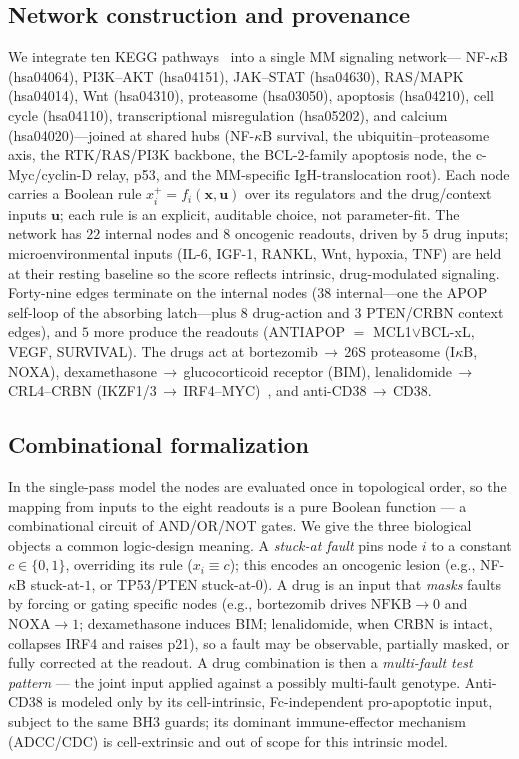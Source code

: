 \documentclass[conference,letterpaper]{IEEEtran}
\begin{document}
\subsection{Network construction and provenance}\label{sec:net}
We integrate ten KEGG pathways~\cite{kegg} into a single MM signaling network---%
NF-$\kappa$B (hsa04064), PI3K--AKT (hsa04151), JAK--STAT (hsa04630), RAS/MAPK
(hsa04014), Wnt (hsa04310), proteasome (hsa03050), apoptosis (hsa04210), cell
cycle (hsa04110), transcriptional misregulation (hsa05202), and calcium
(hsa04020)---joined at shared hubs (NF-$\kappa$B survival, the
ubiquitin--proteasome axis, the RTK/RAS/PI3K backbone, the BCL-2-family apoptosis
node, the c-Myc/cyclin-D relay, p53, and the MM-specific IgH-translocation root).
Each node carries a Boolean rule $x_i^{+}=f_i(\mathbf{x},\mathbf{u})$ over its
regulators and the drug/context inputs $\mathbf{u}$; each rule is an explicit,
auditable choice, not parameter-fit. The network has $22$ internal nodes and $8$
oncogenic readouts, driven by $5$ drug inputs; microenvironmental inputs (IL-6,
IGF-1, RANKL, Wnt, hypoxia, TNF) are held at their resting baseline so the score
reflects intrinsic, drug-modulated signaling. Forty-nine edges terminate on the
internal nodes ($38$ internal---one the APOP self-loop of the absorbing
latch---plus $8$ drug-action and $3$ PTEN/CRBN context edges), and $5$ more
produce the readouts (ANTIAPOP $=$ MCL1$\vee$BCL-xL, VEGF, SURVIVAL). The drugs
act at bortezomib\,$\to$\,26S proteasome (I$\kappa$B, NOXA),
dexamethasone\,$\to$\,glucocorticoid receptor (BIM),
lenalidomide\,$\to$\,CRL4--CRBN (IKZF1/3\,$\to$\,IRF4--MYC)~\cite{kronke}, and
anti-CD38\,$\to$\,CD38.


\subsection{Combinational formalization}\label{sec:comb}
In the single-pass model the nodes are evaluated once in topological order, so
the mapping from inputs to the eight readouts is a pure Boolean function --- a
combinational circuit of AND/OR/NOT gates. We give the three biological objects a
common logic-design meaning. A \emph{stuck-at fault} pins node $i$ to a constant
$c\in\{0,1\}$, overriding its rule ($x_i\equiv c$); this encodes an oncogenic
lesion (e.g., NF-$\kappa$B stuck-at-$1$, or TP53/PTEN stuck-at-$0$). A drug is an
input that \emph{masks} faults by forcing or gating specific nodes (e.g.,
bortezomib drives $\text{NFKB}\!\to\!0$ and $\text{NOXA}\!\to\!1$; dexamethasone
induces BIM; lenalidomide, when CRBN is intact, collapses IRF4 and raises p21),
so a fault may be observable, partially masked, or fully corrected at the
readout. A drug combination is then a \emph{multi-fault test pattern} --- the
joint input applied against a possibly multi-fault genotype. Anti-CD38 is modeled
only by its cell-intrinsic, Fc-independent pro-apoptotic input, subject to the
same BH3 guards; its dominant immune-effector mechanism (ADCC/CDC) is
cell-extrinsic and out of scope for this intrinsic model.
\end{document}
